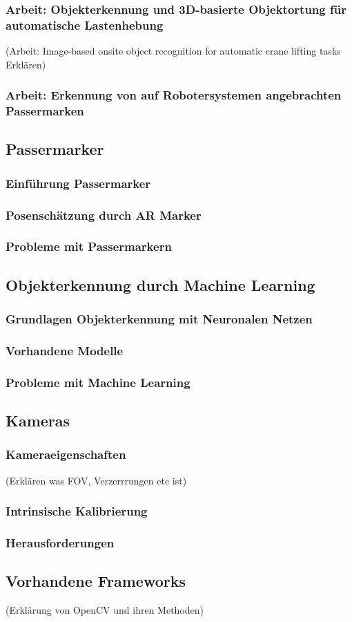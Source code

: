 \subsubsection{Arbeit: Objekterkennung und 3D-basierte Objektortung für automatische Lastenhebung}
(Arbeit: Image-based onsite object recognition for automatic crane lifting tasks\cite{zhou_image-based_2021} Erklären)

\subsubsection{Arbeit: Erkennung von auf Robotersystemen angebrachten Passermarken}


\subsection{Passermarker}
\subsubsection{Einführung Passermarker}
\subsubsection{Posenschätzung durch AR Marker}
\subsubsection{Probleme mit Passermarkern}


\subsection{Objekterkennung durch Machine Learning}
\subsubsection{Grundlagen Objekterkennung mit Neuronalen Netzen}
\subsubsection{Vorhandene Modelle}
\subsubsection{Probleme mit Machine Learning}


\subsection{Kameras}
\subsubsection{Kameraeigenschaften}
(Erklären was FOV, Verzerrrungen etc ist)
\subsubsection{Intrinsische Kalibrierung}
\subsubsection{Herausforderungen}

\subsection{Vorhandene Frameworks}
(Erklärung von OpenCV und ihren Methoden)

